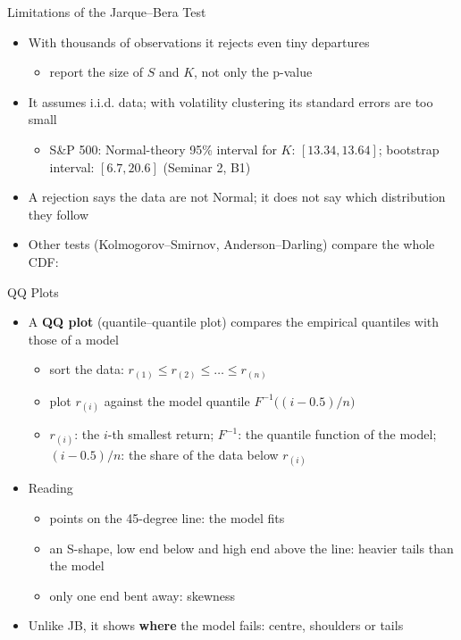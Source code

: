 \begin{frame}{Limitations of the Jarque--Bera Test}
\itemsize{\small}
\begin{itemize}
    \item With thousands of observations it rejects even tiny departures
    \begin{itemize}
        \item report the size of $S$ and $K$, not only the p-value
    \end{itemize}
    \item It assumes i.i.d. data; with volatility clustering its standard errors are too small
    \begin{itemize}
        \item S\&P 500: Normal-theory 95\% interval for $K$: $[13.34, 13.64]$; bootstrap interval: $[6.7, 20.6]$ (Seminar 2, B1)
    \end{itemize}
    \item A rejection says the data are not Normal; it does not say which distribution they follow
    \item Other tests (Kolmogorov--Smirnov, Anderson--Darling) compare the whole CDF: 
\end{itemize}
\end{frame}

\begin{frame}{QQ Plots}
\itemsize{\small}
\begin{itemize}
    \item A \textbf{QQ plot} (quantile--quantile plot) compares the empirical quantiles with those of a model 
    \begin{itemize}
        \item sort the data: $r_{(1)} \le r_{(2)} \le \dots \le r_{(n)}$
        \item plot $r_{(i)}$ against the model quantile $F^{-1}\big((i - 0.5)/n\big)$
        \item $r_{(i)}$: the $i$-th smallest return; $F^{-1}$: the quantile function of the model; $(i - 0.5)/n$: the share of the data below $r_{(i)}$
    \end{itemize}
    \item Reading
    \begin{itemize}
        \item points on the 45-degree line: the model fits
        \item an S-shape, low end below and high end above the line: heavier tails than the model
        \item only one end bent away: skewness
    \end{itemize}
    \item Unlike JB, it shows \textbf{where} the model fails: centre, shoulders or tails
\end{itemize}
\end{frame}

